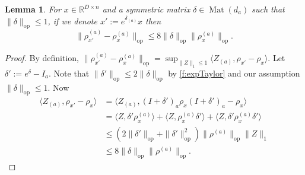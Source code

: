 \documentclass[aos]{imsart}
\newtheorem{lemma}[theorem]{Lemma}
\theoremstyle{definition}
\numberwithin{equation}{section}
\DeclareMathOperator{\op}{op}
\DeclareMathOperator{\Mat}{Mat}
\newcommand{\R}{{\mathbb{R}}}
\newcommand{\samp}{x}
\begin{document}
\begin{appendix}
\begin{lemma} \label{atoaaRobustness}
For $\samp \in \R^{D \times n}$ and a symmetric matrix $\delta \in \Mat(d_{a})$ such that $\|\delta\|_{\op} \leq 1$, if we denote $\samp' := e^{\delta_{(a)}} \samp$ then
\[ \|\rho_{\samp'}^{(a)} - \rho_{\samp}^{(a)}\|_{\op} \leq 8 \|\delta\|_{\op} \|\rho_{\samp}^{(a)}\|_{\op}   . \]
\end{lemma}
\begin{proof}By definition, $\|\rho_{\samp'}^{(a)} - \rho_{\samp}^{(a)}\|_{\op} = \sup_{\|Z\|_{1} \leq 1} \langle Z_{(a)}, \rho_{\samp'} - \rho_{\samp} \rangle $.
Let $\delta' := e^{\delta} - I_{a}$. Note that $\|\delta'\|_{\op} \leq 2 \|\delta\|_{\op}$ by \cref{f:expTaylor} and our assumption $\|\delta\|_{\op} \leq 1$. Now
\begin{align*} \langle Z_{(a)}, \rho_{\samp'} - \rho_{\samp} \rangle &= \langle Z_{(a)}, (I+\delta')_a \rho_{\samp} (I+\delta')_a - \rho_{\samp} \rangle \\
& = \langle Z, \delta' \rho_\samp^{(a)} \rangle + \langle Z, \rho_\samp^{(a)} \delta' \rangle + \langle Z, \delta' \rho_\samp^{(a)} \delta' \rangle \\
& \leq (2\|\delta'\|_{\op} + \|\delta'\|_{\op}^{2}) \|\rho^{(a)}\|_{\op}\|Z\|_1  \\
&\leq 8 \|\delta\|_{\op} \|\rho^{(a)}\|_{\op}.\end{align*}
\end{proof}


\end{appendix}
\end{document}
